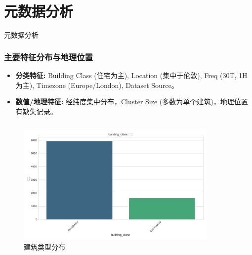 \documentclass{beamer} %
\begin{document}
\section{元数据分析}
\begin{frame}{元数据分析}
    \frametitle{主要特征分布与地理位置}
    \begin{itemize}
        \item \textbf{分类特征:} Building Class (住宅为主), Location (集中于伦敦), Freq (30T, 1H 为主), Timezone (Europe/London), Dataset Source。
        \item \textbf{数值/地理特征:} 经纬度集中分布，Cluster Size (多数为单个建筑)，地理位置有缺失记录。
    \end{itemize}
    \begin{columns}
        \begin{column}{0.48\textwidth}
            \centering
            \begin{figure}
                \includegraphics[width=\textwidth]{../plots/metadata_dist_building_class.png}
                \caption{建筑类型分布}
            \end{figure}
        \end{column}
        \begin{column}{0.48\textwidth}
            \centering
            \begin{figure}

\end{figure}
\end{column}
\end{columns}
\end{frame}
\end{document}

